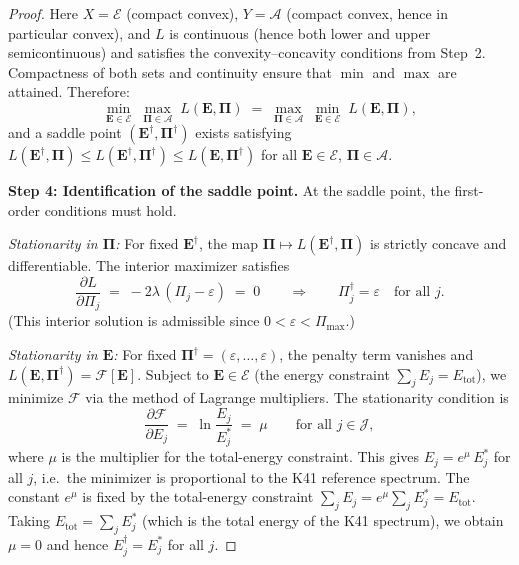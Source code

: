 \documentclass[12pt,a4paper]{article}
\theoremstyle{definition}
\theoremstyle{plain}
\theoremstyle{remark}
\begin{document}
\begin{proof}
Here $X = \mathcal{E}$ (compact convex), $Y = \mathcal{A}$ (compact
convex, hence in particular convex), and $L$ is continuous (hence
both lower and upper semicontinuous) and satisfies the
convexity--concavity conditions from Step~2.  Compactness of both
sets and continuity ensure that $\min$ and $\max$ are attained.
Therefore:
\begin{equation}\label{eq:sion-applied}
  \min_{\mathbf{E} \in \mathcal{E}}\;
  \max_{\boldsymbol{\Pi} \in \mathcal{A}}\;
  L(\mathbf{E}, \boldsymbol{\Pi})
  \;=\;
  \max_{\boldsymbol{\Pi} \in \mathcal{A}}\;
  \min_{\mathbf{E} \in \mathcal{E}}\;
  L(\mathbf{E}, \boldsymbol{\Pi}),
\end{equation}
and a saddle point $(\mathbf{E}^\dagger, \boldsymbol{\Pi}^\dagger)$
exists satisfying
$L(\mathbf{E}^\dagger, \boldsymbol{\Pi})
\le L(\mathbf{E}^\dagger, \boldsymbol{\Pi}^\dagger)
\le L(\mathbf{E}, \boldsymbol{\Pi}^\dagger)$
for all $\mathbf{E} \in \mathcal{E}$,
$\boldsymbol{\Pi} \in \mathcal{A}$.

\smallskip\noindent
\textbf{Step 4: Identification of the saddle point.}\;
At the saddle point, the first-order conditions must hold.

\emph{Stationarity in $\boldsymbol{\Pi}$:}\;
For fixed $\mathbf{E}^\dagger$, the map
$\boldsymbol{\Pi} \mapsto L(\mathbf{E}^\dagger, \boldsymbol{\Pi})$
is strictly concave and differentiable.  The interior maximizer
satisfies
\[
  \frac{\partial L}{\partial \Pi_j}
  \;=\;
  -2\lambda\,(\Pi_j - \varepsilon)
  \;=\; 0
  \qquad\Longrightarrow\qquad
  \Pi_j^\dagger = \varepsilon \quad\text{for all } j.
\]
(This interior solution is admissible since
$0 < \varepsilon < \Pi_{\max}$.)

\emph{Stationarity in $\mathbf{E}$:}\;
For fixed $\boldsymbol{\Pi}^\dagger = (\varepsilon, \dots, \varepsilon)$,
the penalty term vanishes and
$L(\mathbf{E}, \boldsymbol{\Pi}^\dagger) = \mathcal{F}[\mathbf{E}]$.
Subject to $\mathbf{E} \in \mathcal{E}$ (the energy constraint
$\sum_j E_j = E_{\mathrm{tot}}$), we minimize $\mathcal{F}$ via the
method of Lagrange multipliers.  The stationarity condition is
\[
  \frac{\partial \mathcal{F}}{\partial E_j}
  \;=\;
  \ln\frac{E_j}{E_j^*}
  \;=\; \mu
  \qquad\text{for all } j \in \mathcal{J},
\]
where $\mu$ is the multiplier for the total-energy constraint.
This gives $E_j = e^\mu\,E_j^*$ for all $j$, i.e.\ the minimizer is
proportional to the K41 reference spectrum.  The constant $e^\mu$ is
fixed by the total-energy constraint
$\sum_j E_j = e^\mu \sum_j E_j^* = E_{\mathrm{tot}}$.  Taking
$E_{\mathrm{tot}} = \sum_j E_j^*$ (which is the total energy of the
K41 spectrum), we obtain $\mu = 0$ and hence
$E_j^\dagger = E_j^*$ for all $j$.


\end{proof}
\end{document}
